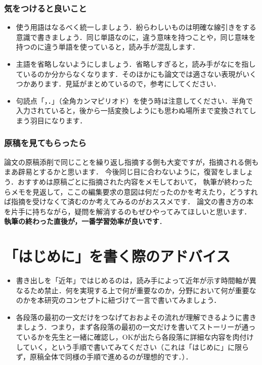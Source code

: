 \subsubsection{気をつけると良いこと}
\begin{itemize}
    \item 使う用語はなるべく統一しましょう．紛らわしいものは明確な線引きをする意識で書きましょう．同じ単語なのに，違う意味を持つことや，同じ意味を持つのに違う単語を使っていると，読み手が混乱します．
    \item 主語を省略しないようにしましょう．省略しすぎると，読み手がなにを指しているのか分からなくなります．そのほかにも論文では適さない表現がいくつかあります．見延\cite{minobe}がまとめているので，参考にしてください．
    \item 句読点「，．」（全角カンマピリオド）を使う時は注意してください．半角で入力されていると，後から一括変換しようにも思わぬ場所まで変換されてしまう羽目になります．
\end{itemize}

\subsubsection{原稿を見てもらったら}
論文の原稿添削で同じことを繰り返し指摘する側も大変ですが，指摘される側もまあ辟易とするかと思います．
今後同じ目に合わないように，復習をしましょう．おすすめは原稿ごとに指摘された内容をメモしておいて，
執筆が終わったらメモを見返して，ここの編集要求の意図は何だったのかを考えたり，どうすれば指摘を受けなくて済むのか考えてみるのがおススメです．
論文の書き方の本を片手に持ちながら，疑問を解消するのもぜひやってみてほしいと思います．
\textbf{執筆の終わった直後が，一番学習効率が良いです}．

\section{「はじめに」を書く際のアドバイス}
\begin{itemize}
    \item 書き出しを「近年」ではじめるのは，読み手によって近年が示す時間軸が異なるため禁止．何を実現する上で何が重要なのか，分野において何が重要なのかを本研究のコンセプトに紐づけて一言で書いてみましょう．
    \item 各段落の最初の一文だけをつなげておおよその流れが理解できるように書きましょう．つまり，まず各段落の最初の一文だけを書いてストーリーが通っているかを先生と一緒に確認し，OKが出たら各段落に詳細な内容を肉付けしていく，という手順で書いてみてください（これは「はじめに」に限らず，原稿全体で同様の手順で進めるのが理想的です．）．
\end{itemize}